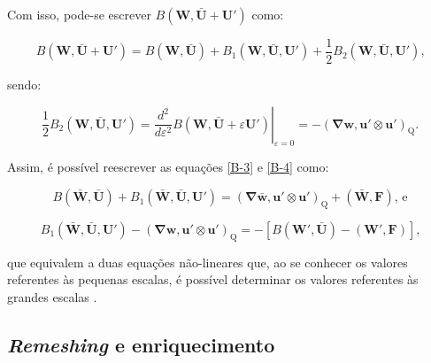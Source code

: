 \documentclass[_ArquivoPrincipal.tex]{subfiles}
\begin{document}
Com isso, pode-se escrever $B(\mathbf{W},\bar{\mathbf{U}}+\mathbf{U}')$ como:

\begin{equation}
    B(\mathbf{W},\bar{\mathbf{U}}+\mathbf{U}')=B(\mathbf{W},\bar{\mathbf{U}})+B_1(\mathbf{W},\bar{\mathbf{U}},\mathbf{U}')+\frac{1}{2}B_2(\mathbf{W},\bar{\mathbf{U}},\mathbf{U}')\text{,}
    \label{B-5}
\end{equation}

\noindent sendo:

\begin{equation}
    \frac{1}{2}B_2(\mathbf{W},\bar{\mathbf{U}},\mathbf{U}')=\left.\frac{d^2}{d\varepsilon^2}B(\mathbf{W},\bar{\mathbf{U}}+\varepsilon\mathbf{U}')\right|_{\varepsilon=0}=-(\mathbf{\nabla}\mathbf{w},\mathbf{u}'\otimes\mathbf{u}')_\mathrm{Q}\text{.}
    \label{B_2}
\end{equation}

Assim, é possível reescrever as equações \ref{B-3} e \ref{B-4} como:

\begin{equation}
    B(\bar{\mathbf{W}},\bar{\mathbf{U}})+B_1(\bar{\mathbf{W}},\bar{\mathbf{U}},\mathbf{U}')=(\mathbf{\nabla}\bar{\mathbf{w}},\mathbf{u}'\otimes\mathbf{u}')_\mathrm{Q}+(\bar{\mathbf{W}},\mathbf{F})\text{, e}
    \label{B-6}
\end{equation}

\begin{equation}
    B_1(\bar{\mathbf{W}},\bar{\mathbf{U}},\mathbf{U}')-(\mathbf{\nabla}\mathbf{w},\mathbf{u}'\otimes\mathbf{u}')_\mathrm{Q}=-[B(\mathbf{W}',\bar{\mathbf{U}})-(\mathbf{W}',\mathbf{F})]\text{,}
    \label{B-7}
\end{equation}

\noindent que equivalem a duas equações não-lineares que, ao se conhecer os valores referentes às pequenas escalas, é possível determinar os valores referentes às grandes escalas \cite{hughes2002variational}.

\subsection{\textit{Remeshing} e enriquecimento} \label{ReE}

\end{document}
